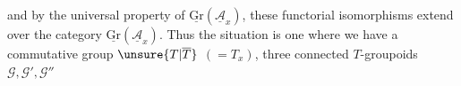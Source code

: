 and by the universal property of $\underline{\mathrm{Gr}}(\underline{\mathcal{A}}_x)$,
these functorial isomorphisms extend over the category
$\underline{\mathrm{Gr}}(\underline{\mathcal{A}}_x)$.
Thus the situation is one where we have a commutative group $\unsure{T|\overline T}$ $(=T_x)$,
three connected $T$-groupoids $\mathcal{G},\mathcal{G}',\mathcal{G}''$




